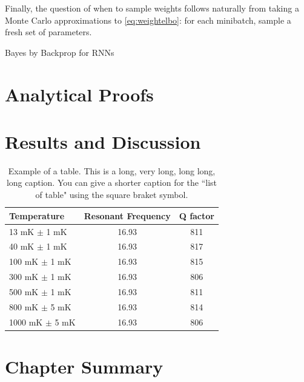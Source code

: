Finally, the question of when to sample weights follows naturally from taking a Monte Carlo approximations to \eqref{eq:weightelbo}: for each minibatch, sample a fresh set of parameters.

\begin{algorithm}[ht]
	\caption{Bayes by Backprop for RNNs}
	\label{alg:rnnbbb}
	\begin{algorithmic}
	\end{algorithmic}
\end{algorithm}

\section{Analytical Proofs}


\section{Results and Discussion}


\begin{table}[p]
	\centering
	\caption[Short version of the caption.]{Example of a table. This is a long, very long, long long, long caption.  You can give a shorter caption for the ``list of table" using the square braket symbol.}
	\vspace{\baselineskip}
	\begin{tabular}{l c c}
		\hline
		\hline
		Temperature & Resonant Frequency & Q factor\\
		\hline
		13 mK $\pm$ 1 mK & 16.93 & 811 \\
		40 mK $\pm$ 1 mK & 16.93 & 817 \\
		100 mK $\pm$ 1 mK & 16.93 & 815 \\
		300 mK $\pm$ 1 mK & 16.93 & 806\\
		500 mK $\pm$ 1 mK & 16.93 & 811\\
		800 mK $\pm$ 5 mK & 16.93 & 814\\
		1000 mK $\pm$ 5 mK & 16.93 & 806 \\
		\hline
		\hline
	\end{tabular}
\end{table}

\section{Chapter Summary}